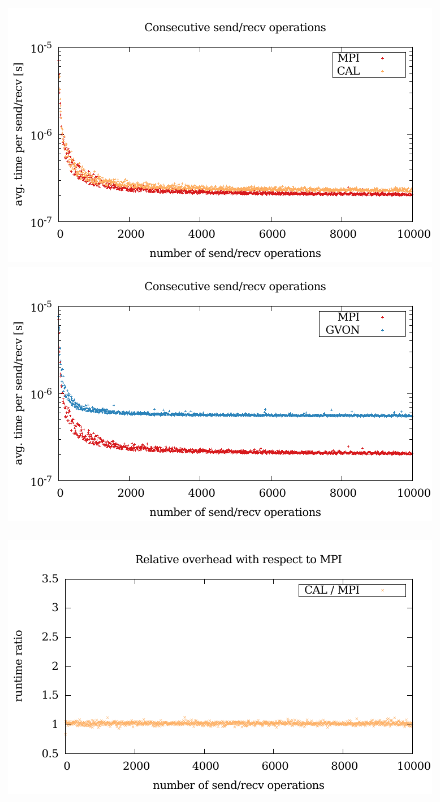 \begin{figure}[H]
  \label{fig:nsend_kepler}
  \begin{minipage}[t]{0.5\textwidth} 
    \includegraphics[width=\textwidth]{plots/50_nsend_cal_kepler}
    \includegraphics[width=\textwidth]{plots/50_nsend_gvon_kepler}
    \end{minipage}
  \begin{minipage}[t]{0.5\textwidth}
    \includegraphics[width=\textwidth]{plots/50_nsend_overhead_cal}

\end{minipage}
\end{figure}
